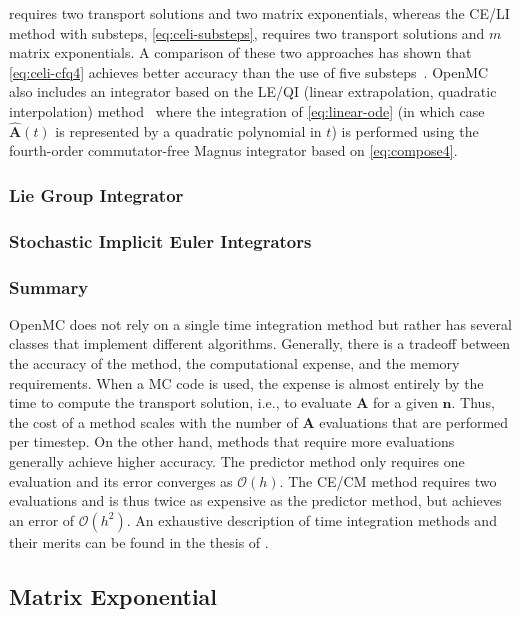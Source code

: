 \documentclass[3p,authoryear]{elsarticle}
\newcommand{\vect}[1]{\mathbf{#1}} %
\begin{document}
 requires two transport solutions and two matrix
exponentials, whereas the CE/LI method with substeps, \cref{eq:celi-substeps},
requires two transport solutions and $m$ matrix exponentials. A comparison of
these two approaches has shown that \cref{eq:celi-cfq4} achieves better accuracy
than the use of five substeps~\citep{josey2017phd}. OpenMC also includes an
integrator based on the LE/QI (linear extrapolation, quadratic interpolation)
method~\citep{isotalo2011ane2} where the integration of \cref{eq:linear-ode} (in
which case $\hat{\vect{A}}(t)$ is represented by a quadratic polynomial in $t$)
is performed using the fourth-order commutator-free Magnus integrator based on
\cref{eq:compose4}.

\subsubsection{Lie Group Integrator}

\citep{celledoni2004fgcs}

\subsubsection{Stochastic Implicit Euler Integrators}


\subsubsection{Summary}

OpenMC does not rely on a single time integration method but rather has several
classes that implement different algorithms. Generally, there is a tradeoff
between the accuracy of the method, the computational expense, and the memory
requirements. When a MC code is used, the expense is almost entirely by the time
to compute the transport solution, i.e., to evaluate $\vect{A}$ for a given
$\vect{n}$. Thus, the cost of a method scales with the number of $\vect{A}$
evaluations that are performed per timestep. On the other hand, methods that
require more evaluations generally achieve higher accuracy. The predictor method
only requires one evaluation and its error converges as $\mathcal{O}(h)$. The
CE/CM method requires two evaluations and is thus twice as expensive as the
predictor method, but achieves an error of $\mathcal{O}(h^2)$. An exhaustive
description of time integration methods and their merits can be found in the
thesis of \citet{josey2017phd}.


\subsection{Matrix Exponential}
\end{document}
